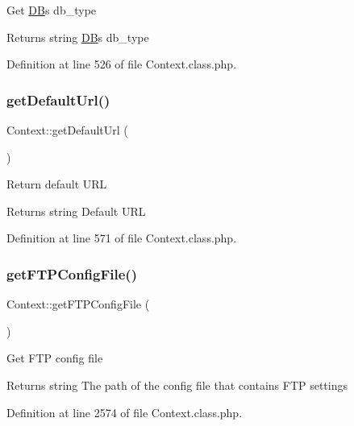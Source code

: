 Get \hyperlink{classDB}{DB}\textquotesingle{}s db\+\_\+type

\begin{DoxyReturn}{Returns}
string \hyperlink{classDB}{DB}\textquotesingle{}s db\+\_\+type 
\end{DoxyReturn}


Definition at line 526 of file Context.\+class.\+php.

\mbox{\label{classContext_abf99203a93b0b0de0da3fbeced6ce333}} 
\subsubsection{\texorpdfstring{get\+Default\+Url()}{getDefaultUrl()}}
{\footnotesize\ttfamily Context\+::get\+Default\+Url (\begin{DoxyParamCaption}{ }\end{DoxyParamCaption})}

Return default U\+RL

\begin{DoxyReturn}{Returns}
string Default U\+RL 
\end{DoxyReturn}


Definition at line 571 of file Context.\+class.\+php.

\mbox{\label{classContext_ab7bb799f55be29174c8a15659dab823a}} 
\subsubsection{\texorpdfstring{get\+F\+T\+P\+Config\+File()}{getFTPConfigFile()}}
{\footnotesize\ttfamily Context\+::get\+F\+T\+P\+Config\+File (\begin{DoxyParamCaption}{ }\end{DoxyParamCaption})}

Get F\+TP config file

\begin{DoxyReturn}{Returns}
string The path of the config file that contains F\+TP settings 
\end{DoxyReturn}


Definition at line 2574 of file Context.\+class.\+php.


